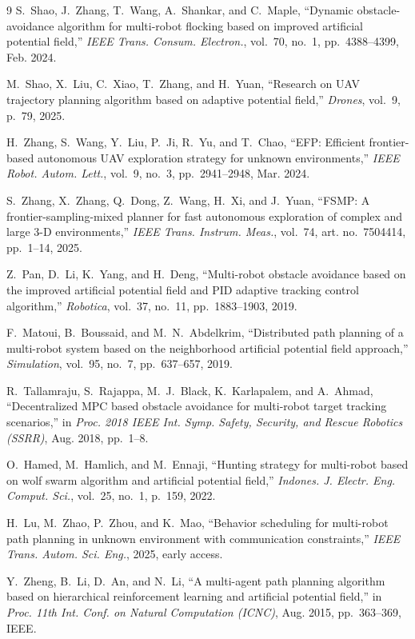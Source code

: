 \documentclass[fleqn,10pt,twocolumn]{main}
\begin{document}
\begin{thebibliography}{9}
S.~Shao, J.~Zhang, T.~Wang, A.~Shankar, and C.~Maple, ``Dynamic obstacle-avoidance algorithm for multi-robot flocking based on improved artificial potential field,'' \emph{IEEE Trans. Consum. Electron.}, vol.~70, no.~1, pp.~4388--4399, Feb. 2024.

M.~Shao, X.~Liu, C.~Xiao, T.~Zhang, and H.~Yuan, ``Research on UAV trajectory planning algorithm based on adaptive potential field,'' \emph{Drones}, vol.~9, p.~79, 2025.

H.~Zhang, S.~Wang, Y.~Liu, P.~Ji, R.~Yu, and T.~Chao, ``EFP: Efficient frontier-based autonomous UAV exploration strategy for unknown environments,'' \emph{IEEE Robot. Autom. Lett.}, vol.~9, no.~3, pp.~2941--2948, Mar. 2024.

S.~Zhang, X.~Zhang, Q.~Dong, Z.~Wang, H.~Xi, and J.~Yuan, ``FSMP: A frontier-sampling-mixed planner for fast autonomous exploration of complex and large 3-D environments,'' \emph{IEEE Trans. Instrum. Meas.}, vol.~74, art. no.~7504414, pp.~1--14, 2025.
%

Z.~Pan, D.~Li, K.~Yang, and H.~Deng, ``Multi-robot obstacle avoidance based on the improved artificial potential field and PID adaptive tracking control algorithm,'' \emph{Robotica}, vol.~37, no.~11, pp.~1883--1903, 2019.

F.~Matoui, B.~Boussaid, and M.~N.~Abdelkrim, ``Distributed path planning of a multi-robot system based on the neighborhood artificial potential field approach,'' \emph{Simulation}, vol.~95, no.~7, pp.~637--657, 2019.

R.~Tallamraju, S.~Rajappa, M.~J.~Black, K.~Karlapalem, and A.~Ahmad, ``Decentralized MPC based obstacle avoidance for multi-robot target tracking scenarios,'' in \emph{Proc. 2018 IEEE Int. Symp. Safety, Security, and Rescue Robotics (SSRR)}, Aug. 2018, pp.~1--8.

O.~Hamed, M.~Hamlich, and M.~Ennaji, ``Hunting strategy for multi-robot based on wolf swarm algorithm and artificial potential field,'' \emph{Indones. J. Electr. Eng. Comput. Sci.}, vol.~25, no.~1, p.~159, 2022.

H.~Lu, M.~Zhao, P.~Zhou, and K.~Mao, ``Behavior scheduling for multi-robot path planning in unknown environment with communication constraints,'' \emph{IEEE Trans. Autom. Sci. Eng.}, 2025, early access.
%

Y.~Zheng, B.~Li, D.~An, and N.~Li, ``A multi-agent path planning algorithm based on hierarchical reinforcement learning and artificial potential field,'' in \emph{Proc. 11th Int. Conf. on Natural Computation (ICNC)}, Aug. 2015, pp.~363--369, IEEE.


\end{thebibliography}
\end{document}
